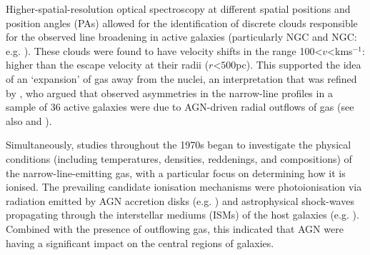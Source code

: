 Higher-spatial-resolution optical spectroscopy at different spatial positions and position angles (PAs) allowed for the identification of discrete clouds responsible for the observed line broadening in active galaxies (particularly NGC and NGC: e.g. \citealt{Merle1968, Anderson1970, Glaspey1976}). These clouds were found to have velocity shifts in the range 100\;\textless\;$v$\;\textless{}\;km\;s$^{-1}$: higher than the escape velocity at their radii ($r$\;\textless\;$500$\;pc). This supported the idea of an `expansion' of gas away from the nuclei, an interpretation that was refined by \citet{Heckman1981}, who argued that observed asymmetries in the narrow-line profiles in a sample of 36 active galaxies were due to AGN-driven radial outflows of gas (see also \citealt{Grandi1977} and \citealt{Heckman1983}).

Simultaneously, studies throughout the 1970s began to investigate the physical conditions (including temperatures, densities, reddenings, and compositions) of the narrow-line-emitting gas, with a particular focus on determining how it is ionised. The prevailing candidate ionisation mechanisms were photoionisation via radiation emitted by AGN accretion disks (e.g. \citealt{MacAlpine1972, Baldwin1975, Shields1975, OsterbrockKoski1976, Ferland1979}) and astrophysical shock-waves propagating through the interstellar mediums (ISMs) of the host galaxies (e.g. \citealt{Cox1972, Koski1976, Fosbury1978, Penston1978}). Combined with the presence of outflowing gas, this indicated that AGN were having a significant impact on the central regions of galaxies.

